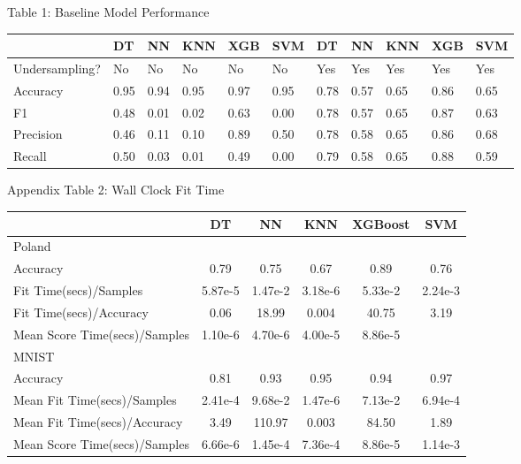 \documentclass{article}
\begin{document}
\begin{table}
	\centering
	Table 1: Baseline Model Performance
	\begin{tabular}{ l l l l l l | l l l l l }
		\hline
		&DT  & NN & KNN& XGB & SVM & DT & NN & KNN & XGB & SVM \\
		\hline
		Undersampling?&No  &No  &No  & No &No  &Yes &Yes &Yes &Yes &Yes \\
		Accuracy      &0.95&0.94&0.95&0.97&0.95&0.78&0.57&0.65&0.86&0.65\\
		F1            &0.48&0.01&0.02&0.63&0.00&0.78&0.57&0.65&0.87&0.63\\
		Precision     &0.46&0.11&0.10&0.89&0.50&0.78&0.58&0.65&0.86&0.68\\
		Recall        &0.50&0.03&0.01&0.49&0.00&0.79&0.58&0.65&0.88&0.59\\
		
		\hline 
		
		
	\end{tabular}
\end{table}


\begin{table}
	
	\centering
	Appendix Table 2: Wall Clock Fit Time\\
	\begin{tabular}{ l c c c c c }
		\hline
		& DT & NN & KNN & XGBoost & SVM \\
		\hline
		Poland & &&&&\\
		Accuracy & 0.79 & 0.75 & 0.67 & 0.89 & 0.76\\

		Fit Time(secs)/Samples & 5.87e-5 & 1.47e-2 & 3.18e-6 & 5.33e-2 & 2.24e-3 \\
		Fit Time(secs)/Accuracy & 0.06 & 18.99 & 0.004 & 40.75 & 3.19\\
		Mean Score Time(secs)/Samples & 1.10e-6 & 4.70e-6 & 4.00e-5 & 8.86e-5& \\
		\hline 
		MNIST & &&&&\\
		Accuracy & 0.81 & 0.93 & 0.95 & 0.94 & 0.97\\
		
		Mean Fit Time(secs)/Samples & 2.41e-4 & 9.68e-2 & 1.47e-6 & 7.13e-2 & 6.94e-4 \\
		Mean Fit Time(secs)/Accuracy & 3.49 & 110.97 & 0.003 & 84.50 & 1.89\\
		Mean Score Time(secs)/Samples & 6.66e-6 & 1.45e-4 & 7.36e-4 & 8.86e-5& 1.14e-3\\
		\hline
	\end{tabular}
\end{table}
\end{document}

